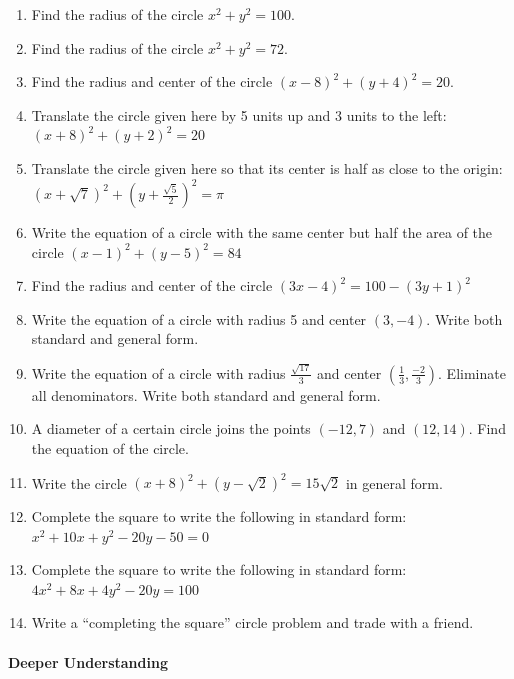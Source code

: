\documentclass[
]{article}
\providecommand{\tightlist}{%
  \setlength{\itemsep}{0pt}\setlength{\parskip}{0pt}}
\def\tightlist{}
\begin{document}
\begin{enumerate}
\def\labelenumi{\arabic{enumi}.}
\tightlist
\item
  Find the radius of the circle \(x^2 + y^2 = 100\).
\item
  Find the radius of the circle \(x^2 + y^2 = 72\).
\item
  Find the radius and center of the circle \((x-8)^2 + (y+4)^2 = 20\).
\item
  Translate the circle given here by 5 units up and 3 units to the left:
  \((x+8)^2 + (y+2)^2 = 20\)
\item
  Translate the circle given here so that its center is half as close to
  the origin: \((x+\sqrt{7})^2 + (y + \frac{\sqrt{5}}{2})^2 = \pi\)
\item
  Write the equation of a circle with the same center but half the area
  of the circle \((x-1)^2+(y-5)^2=84\)
\item
  Find the radius and center of the circle
  \((3x-4)^2 = 100 - (3y + 1)^2\)
\item
  Write the equation of a circle with radius 5 and center \((3,-4)\).
  Write both standard and general form.
\item
  Write the equation of a circle with radius \(\frac{\sqrt{17}}{3}\) and
  center \((\frac13,\frac{-2}{3})\). Eliminate all denominators. Write
  both standard and general form.
\item
  A diameter of a certain circle joins the points \((-12,7)\) and
  \((12,14)\). Find the equation of the circle.
\item
  Write the circle \((x+8)^2 + (y - \sqrt2)^2 = 15\sqrt 2\) in general
  form.
\item
  Complete the square to write the following in standard form:
  \(x^2 + 10x + y^2 - 20y - 50 = 0\)
\item
  Complete the square to write the following in standard form:
  \(4x^2 + 8x + 4y^2 - 20y = 100\)
\item
  Write a ``completing the square'' circle problem and trade with a
  friend.
\end{enumerate}

\hypertarget{deeper-understanding}{%
\paragraph{Deeper Understanding}\label{deeper-understanding}}
\end{document}
